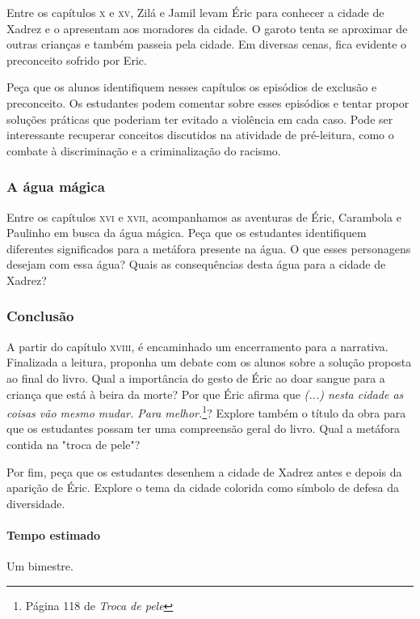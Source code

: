 \documentclass[11pt]{extarticle}
\begin{document}
Entre os capítulos \textsc{x} e \textsc{xv}, Zilá e Jamil levam Éric para conhecer a cidade de Xadrez e o apresentam aos moradores da cidade. O garoto tenta se aproximar de outras crianças e também passeia pela cidade. Em diversas cenas, fica evidente o preconceito sofrido por Eric.

Peça que os alunos identifiquem nesses capítulos os episódios de exclusão e preconceito. Os estudantes podem comentar sobre esses episódios e tentar propor soluções práticas que poderiam ter evitado a violência em cada caso. Pode ser interessante recuperar conceitos discutidos na atividade de pré-leitura, como o combate à discriminação e a criminalização do racismo.


\subsubsection{A água mágica}

Entre os capítulos \textsc{xvi} e \textsc{xvii}, acompanhamos as aventuras de Éric, Carambola e Paulinho em busca da água mágica. Peça que os estudantes identifiquem diferentes significados para a metáfora presente na água. O que esses personagens desejam com essa água? Quais as consequências desta água para a cidade de Xadrez?

\subsubsection{Conclusão}

A partir do capítulo \textsc{xviii}, é encaminhado um encerramento para a narrativa. Finalizada a leitura, proponha um debate com os alunos sobre a solução proposta ao final do livro. Qual a importância do gesto de Éric ao doar sangue para a criança que está à beira da morte? Por que Éric afirma que \textit{(...) nesta cidade as coisas vão mesmo mudar. Para melhor.}\footnote{Página 118 de \textit{Troca de pele}}? Explore também o título da obra para que os estudantes possam ter uma compreensão geral do livro. Qual a metáfora contida na "troca de pele"? 

Por fim, peça que os estudantes desenhem a cidade de Xadrez antes e depois da aparição de Éric. Explore o tema da cidade colorida como símbolo de defesa da diversidade.

\paragraph{Tempo estimado} Um bimestre.
\end{document}
